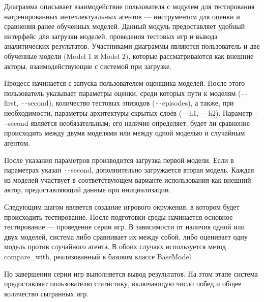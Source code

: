 Диаграмма  описывает взаимодействие пользователя с модулем для тестирования натренированных интеллектуальных агентов --- инструментом для оценки и сравнения ранее обученных моделей. Данный модуль предоставляет удобный интерфейс для загрузки моделей, проведения тестовых игр и вывода аналитических результатов. Участниками диаграммы являются пользователь и две обученные модели (Model 1 и Model 2), которые рассматриваются как внешние акторы, взаимодействующие с системой при загрузке.


Процесс начинается с запуска пользователем оценщика моделей. После этого пользователь указывает параметры оценки, среди которых пути к моделям (\texttt{-{}-}first, \texttt{-{}-}second), количество тестовых эпизодов (\texttt{-{}-}episodes), а также, при необходимости, параметры архитектуры скрытых слоёв (\texttt{-{}-}h1, \texttt{-{}-}h2). Параметр \texttt{-{}-}second является необязательным; его наличие определяет, будет ли сравнение происходить между двумя моделями или между одной моделью и случайным агентом.

После указания параметров производится загрузка первой модели. Если в параметрах указан \texttt{-{}-}second, дополнительно загружается вторая модель. Каждая из моделей участвует в соответствующем варианте использования как внешний актор, предоставляющий данные при инициализации.

Следующим шагом является создание игрового окружения, в котором будет происходить тестирование. После подготовки среды начинается основное тестирование --- проведение серии игр. В зависимости от наличия одной или двух моделей, система либо сравнивает их между собой, либо оценивает одну модель против случайного агента. В обоих случаях используется метод compare\_with, реализованный в базовом классе BaseModel.

По завершении серии игр выполняется вывод результатов. На этом этапе система предоставляет пользователю статистику, включающую число побед и общее количество сыгранных игр.
